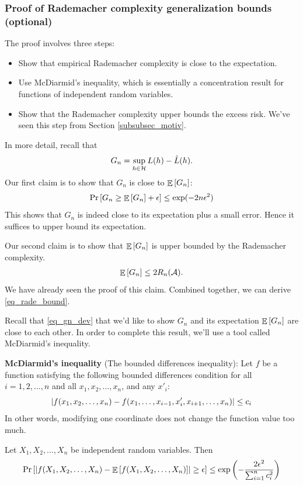 \subsubsection{Proof of Rademacher complexity generalization bounds (optional)}

The proof involves three steps:
\begin{itemize}
    \item Show that empirical Rademacher complexity is close to the expectation.
    \item Use McDiarmid's inequality, which is essentially a concentration result for functions of independent random variables.
    \item Show that the Rademacher complexity upper bounds the excess risk. We've seen this step from Section \ref{subsubsec_motiv}.
\end{itemize}
In more detail, recall that \[ G_n = \sup_{h\in\mathcal{H}} L(h) - \hat L(h). \]
Our first claim is to show that $G_n$ is close to $\mathop{\mathbb{E}}\left[ G_n \right]$:
\begin{align}
    \Pr\left[ G_n \ge \mathop{\mathbb{E}}\left[ G_n \right] + \epsilon \right] \le \exp(-2n\epsilon^2) \label{eq_gn_dev}
\end{align}
This shows that $G_n$ is indeed close to its expectation plus a small error. Hence it suffices to upper bound its expectation.

Our second claim is to show that $\mathop{\mathbb{E}}\left[ G_n \right]$ is upper bounded by the Rademacher complexity.
\begin{align*}
    \mathop{\mathbb{E}}\left[ G_n \right] \le 2R_n(\mathcal{A}).
\end{align*}
We have already seen the proof of this claim.
Combined together, we can derive \eqref{eq_rade_bound}.

Recall that \eqref{eq_gn_dev} that we'd like to show $G_n$ and its expectation $\mathop{\mathbb{E}}\left[ G_n \right]$ are close to each other.
In order to complete this result, we'll use a tool called McDiarmid’s inequality.

\begin{mdframed}[
    roundcorner=10pt,
    leftmargin=0.04\textwidth,
    rightmargin=0.04\textwidth]
    \textbf{McDiarmid’s inequality} (The bounded differences inequality):
    Let $f$ be a function satisfying the following bounded differences condition for all $i = 1, 2, \dots, n$ and all $x_1, x_2, \dots, x_n$, and any $x'_i$:
    \[ {\left| { f(x_1, x_2, \dots, x_n) - f(x_1, \dots, x_{i-1}, x'_i, x_{i+1}, \dots, x_n) } \right|} \le c_i \]
    In other words, modifying one coordinate does not change the function value too much.

    Let $X_1, X_2, \dots, X_n$ be independent random variables. Then
    \begin{align}\label{eq_mcdiarmid} \Pr\left[ {\left| {f(X_1, X_2, \dots, X_n) - \mathop{\mathbb{E}}\left[ f(X_1, X_2, \dots, X_n) \right]} \right|} \ge \epsilon \right] \le \exp \left( - \frac {2 \epsilon^2} {\sum_{i=1}^n c_i^2} \right) \end{align}
\end{mdframed}

